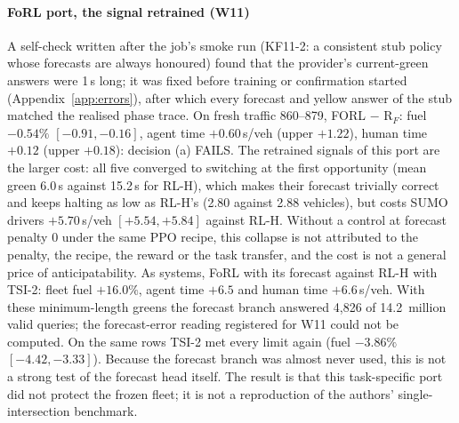 \paragraph{FoRL port, the signal retrained (W11)}
A self-check written after the job's smoke run (KF11-2: a consistent stub policy whose forecasts are always honoured) found that the
provider's current-green answers were 1\,s long; it was fixed before training or confirmation started (Appendix~\ref{app:errors}),
after which every forecast and yellow answer of the stub matched the realised phase trace. On fresh traffic 860--879, FORL $-$ R$_F$:
fuel $-0.54\%$ $[-0.91,-0.16]$, agent time $+0.60$\,s/veh (upper $+1.22$), human time $+0.12$ (upper $+0.18$): decision (a) FAILS.
The retrained signals of this port are the larger cost: all five converged to switching at the first opportunity (mean green 6.0\,s
against 15.2\,s for RL-H), which makes their forecast trivially correct and keeps halting as low as RL-H's (2.80 against 2.88 vehicles),
but costs SUMO drivers $+5.70$\,s/veh $[+5.54,+5.84]$ against RL-H. Without a control at forecast penalty 0 under the same PPO recipe,
this collapse is not attributed to the penalty, the recipe, the reward or the task transfer, and the cost is not a general price of
anticipatability. As systems, FoRL with its forecast against RL-H with TSI-2: fleet fuel
$+16.0\%$, agent time $+6.5$ and human time $+6.6$\,s/veh. With these minimum-length greens the forecast branch answered 4,826 of
14.2~million valid queries; the forecast-error reading registered for W11 could not be computed. On the same rows TSI-2 met every limit
again (fuel $-3.86\%$ $[-4.42,-3.33]$). Because the forecast branch was almost never used, this is not a strong test of the forecast head itself. The result is that this
task-specific port did not protect the frozen fleet; it is not a reproduction of the authors' single-intersection benchmark.


